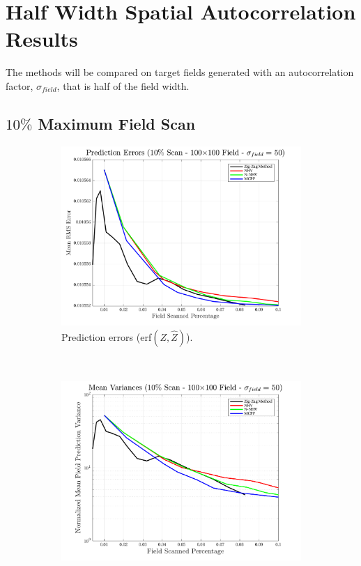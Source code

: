 \section{Half Width Spatial Autocorrelation Results}
The methods will be compared on target fields generated with an autocorrelation factor, $\sigma_{field}$, that is half of the field width.

\clearpage
\subsection{$10\%$ Maximum Field Scan}
\begin{figure}[htb!]
    \centering
    \begin{subfigure}[t]{0.65\textwidth}
        \centering
        \includegraphics[width=\linewidth]{figures/hbresults/pred_errs_10p_100x100_sf_50_seed_2.png}
        \captionsetup{skip=0.20\baselineskip,size=footnotesize}
        \caption{Prediction errors (erf$(Z,\hat{Z})$).}
        \label{fig:prederrs_sigma50_p10_s2}
    \end{subfigure}%
    \\
    \begin{subfigure}[t]{0.65\textwidth}
        \centering
        \includegraphics[width=\linewidth]{figures/hbresults/vars_10p_100x100_sf_50_seed_2.png}

\end{subfigure}
\end{figure}
